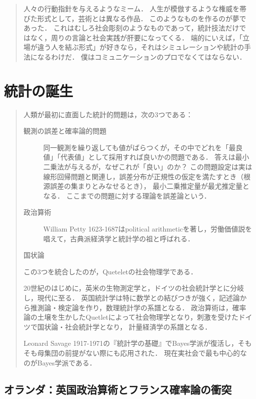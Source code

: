 \documentclass[uplatex,dvipdfmx]{jsreport}
\begin{document}
\begin{quotation}
    人々の行動指針を与えるようなミーム．
    人生が模倣するような権威を帯びた形式として，芸術とは異なる作品．
    このようなものを作るのが夢であった．
    これはむしろ社会彫刻のようなものであって，統計技法だけではなく，周りの言論と社会実践が肝要になってくる．
    端的にいえば，「立場が違う人を結ぶ形式」が好きなら，それはシミュレーションや統計の手法になるわけだ．
    僕はコミュニケーションのプロでなくてはならない．
\end{quotation}

\chapter{統計の誕生}

\begin{quotation}
    人類が最初に直面した統計的問題は，次の3つである：
    \begin{description}
        \item[観測の誤差と確率論的問題] 同一観測を繰り返しても値がばらつくが，その中でどれを「最良値」「代表値」として採用すれば良いかの問題である．
        答えは最小二乗法が与えるが，なぜこれが「良い」のか？\cite{安藤洋美-OLS}
        この問題設定は実は線形回帰問題と関連し，誤差分布が正規性の仮定を満たすとき（根源誤差の集まりとみなせるとき），
        最小二乗推定量が最尤推定量となる．
        ここまでの問題に対する理論を誤差論という．
        \item[政治算術] William Petty 1623-1687はpolitical arithmeticを著し，労働価値説を唱えて，古典派経済学と統計学の祖と呼ばれる．
        \item[国状論] 
    \end{description}
    この3つを統合したのが，Queteletの社会物理学である．

    20世紀のはじめに，英米の生物測定学と，ドイツの社会統計学とに分岐し，現代に至る．
    英国統計学は特に数学との結びつきが強く，記述論から推測論・検定論を作り，数理統計学の系譜となる．
    政治算術は，確率論の土壌を生かしたQuetletによって社会物理学となり，刺激を受けたドイツで国状論・社会統計学となり，
    計量経済学の系譜となる．

    Leonard Savage 1917-1971の『統計学の基礎』でBayes学派が復活し，そもそも母集団の前提がない際にも応用された．
    現在実社会で最も中心的なのがBayes学派である．
\end{quotation}

\section{オランダ：英国政治算術とフランス確率論の衝突}
\end{document}
